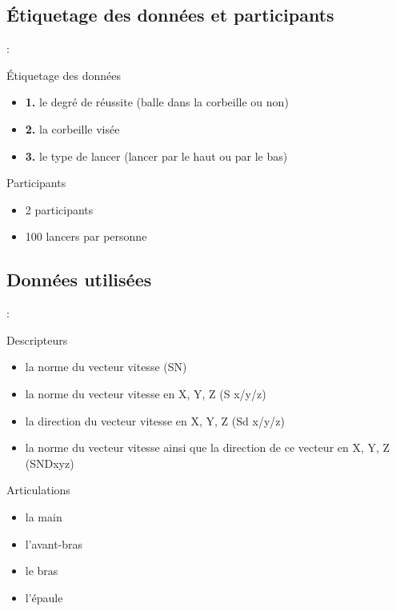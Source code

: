 \documentclass[svgnames]{beamer}
\begin{document}
	\subsection{Étiquetage des données et participants}
	\begin{frame}{\subsecname : \subsecname}
		\begin{block}{Étiquetage des données}
			\begin{itemize}
				\item \textbf{1.} le degré de réussite (balle dans la corbeille ou non)
 				\item \textbf{2.} la corbeille visée
				\item \textbf{3.} le type de lancer (lancer par le haut ou par le bas)
			\end{itemize}
		\end{block}
	
		\begin{block}{Participants}
			\begin{itemize}[label=$\bullet$]
				\item 2 participants
				\item 100 lancers par personne
			\end{itemize}
		\end{block}
	\end{frame}
	
	\subsection{Données utilisées}
	\begin{frame}{\secname : \subsecname}
		\begin{block}{Descripteurs}
			\begin{itemize}
				\item la norme du vecteur vitesse (SN)
				\item la norme du vecteur vitesse en X, Y, Z (S x/y/z)
				\item la direction du vecteur vitesse en X, Y, Z (Sd x/y/z)
				\item la norme du vecteur vitesse ainsi que la direction de ce vecteur en X, Y, Z (SNDxyz)
			\end{itemize}
		\end{block}
		
		\begin{block}{Articulations}
			\begin{itemize}
				\item la main
				\item l'avant-bras
				\item le bras
				\item l'épaule
			\end{itemize}
		\end{block}
	\end{frame}
	
\end{document}
